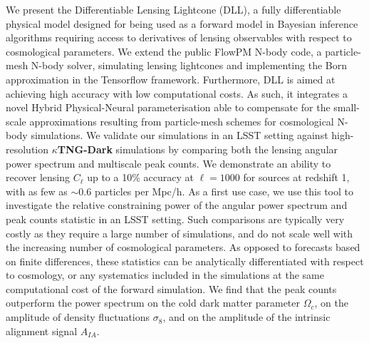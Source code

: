 \documentclass{aa}
\begin{document}
  \abstract
   {}
   {We present the Differentiable Lensing Lightcone (DLL), a fully differentiable physical model designed for being used as a forward model in Bayesian inference algorithms requiring access to derivatives of lensing observables with respect to cosmological parameters. 
}
   {We extend the public FlowPM N-body code, a particle-mesh N-body solver, simulating lensing lightcones and implementing the Born approximation in the Tensorflow framework. Furthermore, DLL is aimed at achieving high accuracy with low computational costs. As such, it integrates a novel Hybrid Physical-Neural parameterisation able to compensate for the small-scale approximations resulting from particle-mesh schemes for cosmological N-body simulations.
We validate our simulations in an LSST setting against high-resolution \textbf{$\kappa$TNG-Dark} simulations by comparing both the lensing angular power spectrum and multiscale peak counts. We demonstrate an ability to recover lensing $C_\ell$ up to a 10\% accuracy at $\ell=1000$ for sources at redshift 1, with as few as $\sim 0.6$ particles per Mpc/h. 
As a first use case, we use this tool to investigate the relative constraining power of the angular power spectrum and peak counts statistic in an LSST setting.
Such comparisons are typically very costly as they require a large number of simulations, and do not scale well with the increasing number of cosmological parameters.  
As opposed to forecasts based on finite differences, these statistics can be analytically differentiated with respect to cosmology, or any systematics included in the simulations at the same computational cost of the forward simulation. }
   {We find that the peak counts outperform the power spectrum on the cold dark matter parameter $\Omega_c$, on the amplitude of density fluctuations $\sigma_8$, and on the
amplitude of the intrinsic alignment signal $A_{IA}$.}
   {}


\maketitle
%
\end{document}
